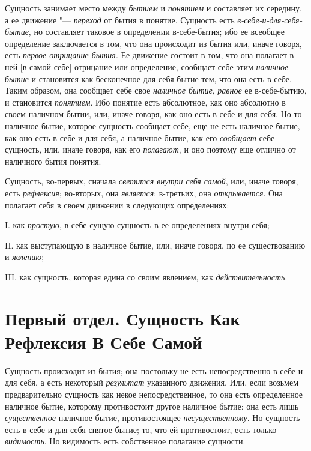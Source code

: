 Сущность занимает место между {\em бытием} и
{\em понятием} и составляет их середину, а ее движение
"--- {\em переход} от бытия в понятие. Сущность есть
{\em в-себе-и-для-себя-бытие}, но составляет таковое в
определении в-себе-бытия; ибо ее всеобщее определение заключается в том,
что она происходит из бытия или, иначе говоря, есть
{\em первое отрицание бытия}. Ее движение состоит в
том, что она полагает в ней [в самой себе] отрицание или определение,
сообщает себе этим {\em наличное бытие} и становится
как бесконечное для-себя-бытие тем, что она есть в себе. Таким образом, она
сообщает себе свое {\em наличное бытие},
{\em равное} ее в-себе-бытию, и становится
{\em понятием}. Ибо понятие есть абсолютное, как оно
абсолютно в своем наличном бытии, или, иначе говоря, как оно есть в себе и
для себя. Но то наличное бытие, которое сущность сообщает себе, еще не есть
наличное бытие, как оно есть в себе и для себя, а наличное бытие, как его
{\em сообщает} себе сущность, или, иначе говоря, как
его {\em полагают}, и оно поэтому еще отлично от
наличного бытия понятия.

Сущность, во-первых, сначала {\em светится внутри себя
самой}, или, иначе говоря, есть {\em рефлексия};
во-вторых, она {\em является}; в-третьих, она
{\em открывается}. Она полагает себя в своем движении в
следующих определениях:

I. как {\em простую}, в-себе-сущую сущность в ее
определениях внутри себя;

II. как выступающую в наличное бытие, или, иначе говоря, по ее существованию
и {\em явлению};

III. как сущность, которая едина со своим явлением, как
{\em действительность}.

\clearpage
\part[{\em Первый отдел} \newline СУЩНОСТЬ КАК РЕФЛЕКСИЯ В СЕБЕ САМОЙ]{Первый отдел. Сущность Как Рефлексия В Себе Самой}
Сущность происходит из бытия; она постольку не
есть непосредственно в себе и для себя, а есть некоторый
{\em результат} указанного движения. Или, если возьмем
предварительно сущность как некое непосредственное, то она есть
определенное наличное бытие, которому противостоит другое наличное бытие:
она есть лишь {\em существенное} наличное бытие,
противостоящее {\em несущественному}. Но сущность есть
в себе и для себя снятое бытие; то, что ей противостоит, есть только
{\em видимость}. Но видимость есть собственное
полагание сущности.

